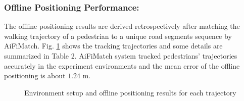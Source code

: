 \documentclass{llncs}
\begin{document}
\subsubsection{Offline Positioning Performance:}

The offline positioning results are derived retrospectively after matching the walking trajectory of a pedestrian to a unique road segments sequence by AiFiMatch. Fig. \ref{fig-envandoffline} shows the tracking trajectories and some details are summarized in Table 2. AiFiMatch system tracked pedestrians' trajectories accurately in the experiment environments and the mean error of the offline positioning is about $1.24$ m.

\begin{figure}[!ht]
	\centering
	\hfil
	\vfil
		\hfil
	\caption{ Environment setup and offline positioning results for each trajectory}
	\label{fig-envandoffline}
\end{figure}
\end{document}
